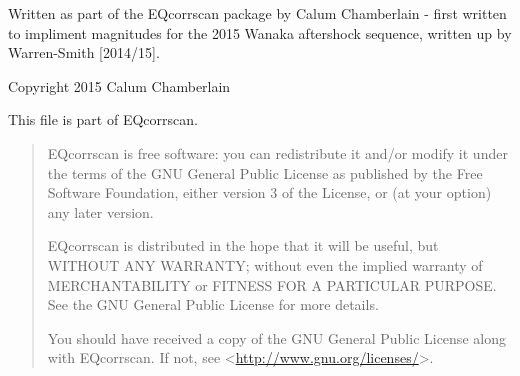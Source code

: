 \documentclass[a4paper,10pt,english]{sphinxmanual}
\begin{document}
Written as part of the EQcorrscan package by Calum Chamberlain - first written
to impliment magnitudes for the 2015 Wanaka aftershock sequence, written up
by Warren-Smith {[}2014/15{]}.

Copyright 2015 Calum Chamberlain

This file is part of EQcorrscan.
\begin{quote}

EQcorrscan is free software: you can redistribute it and/or modify
it under the terms of the GNU General Public License as published by
the Free Software Foundation, either version 3 of the License, or
(at your option) any later version.

EQcorrscan is distributed in the hope that it will be useful,
but WITHOUT ANY WARRANTY; without even the implied warranty of
MERCHANTABILITY or FITNESS FOR A PARTICULAR PURPOSE.  See the
GNU General Public License for more details.

You should have received a copy of the GNU General Public License
along with EQcorrscan.  If not, see \textless{}\href{http://www.gnu.org/licenses/}{http://www.gnu.org/licenses/}\textgreater{}.
\end{quote}
\end{document}
